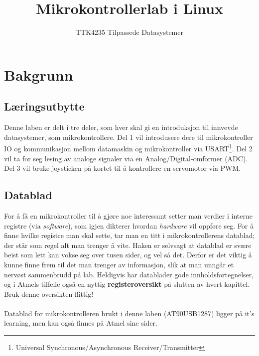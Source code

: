 \documentclass[11pt,a4paper]{article}
\title{Mikrokontrollerlab i Linux}
\author{TTK4235 Tilpassede Datasystemer}
\date{}
\begin{document}
\maketitle
\section{Bakgrunn}
\subsection{Læringsutbytte}
Denne laben er delt i tre deler, som hver skal gi en introduksjon til innvevde datasystemer, som mikrokontrollere. Del 1 vil introdusere dere til mikrokontroller IO og kommunikasjon mellom datamaskin og mikrokontroller via USART\footnote{Universal Synchronous/Asynchronous Receiver/Transmitter}. Del 2 vil ta for seg lesing av analoge signaler via en Analog/Digital-omformer (ADC). Del 3 vil bruke joysticken på kortet til å kontrollere en servomotor via PWM.

\subsection{Datablad}
For å få en mikrokontroller til å gjøre noe interessant setter man verdier i interne registre (via \textit{software}), som igjen dikterer hvordan \textit{hardware} vil oppføre seg. For å finne hvilke registre man skal sette, tar man en titt i mikrokontrollerens datablad; der står som regel alt man trenger å vite. Haken er selvsagt at datablad er svære beist som lett kan vokse seg over tusen sider, og vel så det. Derfor er det viktig å kunne finne frem til det man trenger av informasjon, slik at man unngår et nervøst sammenbrudd på lab. Heldigvis har datablader gode innholdsfortegnelser, og i Atmels tilfelle også en nyttig \textbf{registeroversikt} på slutten av hvert kapittel. Bruk denne oversikten flittig!\\
\\
Datablad for mikrokontrolleren brukt i denne laben (AT90USB1287) ligger på it's learning, men kan også finnes på Atmel sine sider.
\end{document}
